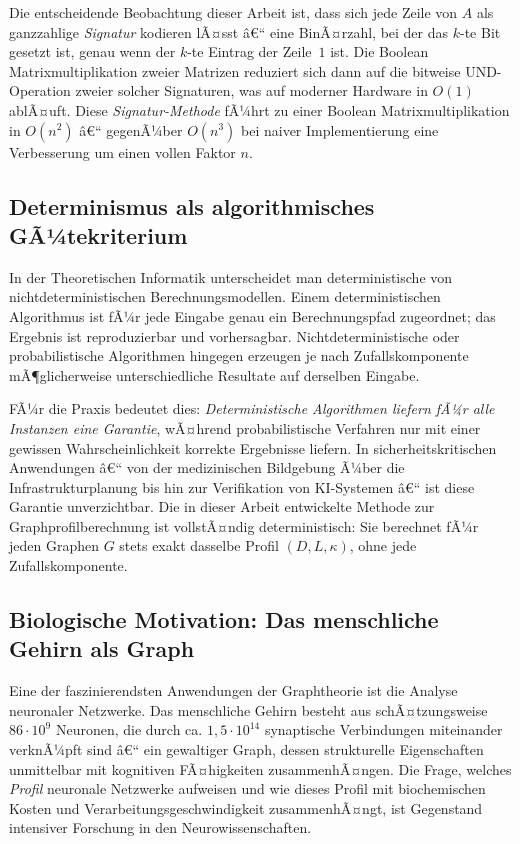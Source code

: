 ﻿\documentclass[a4paper,12pt]{article}
\theoremstyle{definition}
\begin{document}
	Die entscheidende Beobachtung dieser Arbeit ist, dass sich jede Zeile von $A$ als ganzzahlige \emph{Signatur} kodieren lÃ¤sst â€“ eine BinÃ¤rzahl, bei der das $k$-te Bit gesetzt ist, genau wenn der $k$-te Eintrag der Zeile~$1$ ist. Die Boolean Matrixmultiplikation zweier Matrizen reduziert sich dann auf die bitweise UND-Operation zweier solcher Signaturen, was auf moderner Hardware in $O(1)$ ablÃ¤uft. Diese \emph{Signatur-Methode} fÃ¼hrt zu einer Boolean Matrixmultiplikation in $O(n^2)$ â€“ gegenÃ¼ber $O(n^3)$ bei naiver Implementierung eine Verbesserung um einen vollen Faktor $n$.

	\subsection{Determinismus als algorithmisches GÃ¼tekriterium}

	In der Theoretischen Informatik unterscheidet man deterministische von nichtdeterministischen Berechnungsmodellen. Einem deterministischen Algorithmus ist fÃ¼r jede Eingabe genau ein Berechnungspfad zugeordnet; das Ergebnis ist reproduzierbar und vorhersagbar. Nichtdeterministische oder probabilistische Algorithmen hingegen erzeugen je nach Zufallskomponente mÃ¶glicherweise unterschiedliche Resultate auf derselben Eingabe.

	FÃ¼r die Praxis bedeutet dies: \emph{Deterministische Algorithmen liefern fÃ¼r alle Instanzen eine Garantie}, wÃ¤hrend probabilistische Verfahren nur mit einer gewissen Wahrscheinlichkeit korrekte Ergebnisse liefern. In sicherheitskritischen Anwendungen â€“ von der medizinischen Bildgebung Ã¼ber die Infrastrukturplanung bis hin zur Verifikation von KI-Systemen â€“ ist diese Garantie unverzichtbar. Die in dieser Arbeit entwickelte Methode zur Graphprofilberechnung ist vollstÃ¤ndig deterministisch: Sie berechnet fÃ¼r jeden Graphen $G$ stets exakt dasselbe Profil $(D, L, \kappa)$, ohne jede Zufallskomponente.

	\subsection{Biologische Motivation: Das menschliche Gehirn als Graph}

	Eine der faszinierendsten Anwendungen der Graphtheorie ist die Analyse neuronaler Netzwerke. Das menschliche Gehirn besteht aus schÃ¤tzungsweise $86 \cdot 10^9$ Neuronen, die durch ca. $1{,}5 \cdot 10^{14}$ synaptische Verbindungen miteinander verknÃ¼pft sind â€“ ein gewaltiger Graph, dessen strukturelle Eigenschaften unmittelbar mit kognitiven FÃ¤higkeiten zusammenhÃ¤ngen. Die Frage, welches \emph{Profil} neuronale Netzwerke aufweisen und wie dieses Profil mit biochemischen Kosten und Verarbeitungsgeschwindigkeit zusammenhÃ¤ngt, ist Gegenstand intensiver Forschung in den Neurowissenschaften.
\end{document}
